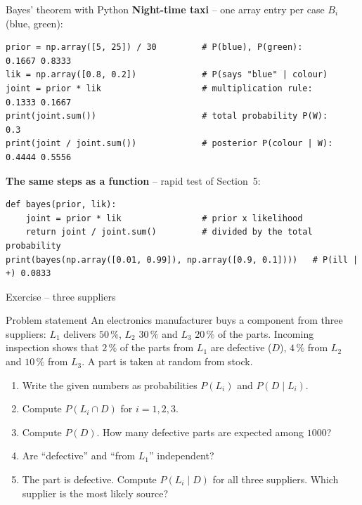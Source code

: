 \documentclass[aspectratio=169,11pt]{beamer}
\begin{document}
\begin{frame}[fragile]{Bayes' theorem with Python}
  \textbf{Night-time taxi} -- one array entry per case $B_i$ (blue, green):
\begin{lstlisting}
prior = np.array([5, 25]) / 30         # P(blue), P(green):         0.1667 0.8333
lik = np.array([0.8, 0.2])             # P(says "blue" | colour)
joint = prior * lik                    # multiplication rule:       0.1333 0.1667
print(joint.sum())                     # total probability P(W):    0.3
print(joint / joint.sum())             # posterior P(colour | W):   0.4444 0.5556
\end{lstlisting}
  \textbf{The same steps as a function} -- rapid test of Section~5:
\begin{lstlisting}
def bayes(prior, lik):
    joint = prior * lik                # prior x likelihood
    return joint / joint.sum()         # divided by the total probability
print(bayes(np.array([0.01, 0.99]), np.array([0.9, 0.1])))   # P(ill | +) 0.0833
\end{lstlisting}
\end{frame}

\begin{frame}{Exercise -- three suppliers}
  \begin{block}{Problem statement}
    An electronics manufacturer buys a component from three suppliers:
    $L_1$ delivers $50\,\%$, $L_2$ $30\,\%$ and $L_3$ $20\,\%$ of the parts.
    Incoming inspection shows that $2\,\%$ of the parts from $L_1$ are
    defective ($D$), $4\,\%$ from $L_2$ and $10\,\%$ from $L_3$. A part is
    taken at random from stock.
    \begin{enumerate}
      \item Write the given numbers as probabilities $P(L_i)$ and
            $P(D\mid L_i)$.
      \item Compute $P(L_i\cap D)$ for $i=1,2,3$.
      \item Compute $P(D)$. How many defective parts are expected among
            $1000$?
      \item Are ``defective'' and ``from $L_1$'' independent?
      \item The part is defective. Compute $P(L_i\mid D)$ for all three
            suppliers. Which supplier is the most likely source?
    \end{enumerate}
  \end{block}
\end{frame}
\end{document}
